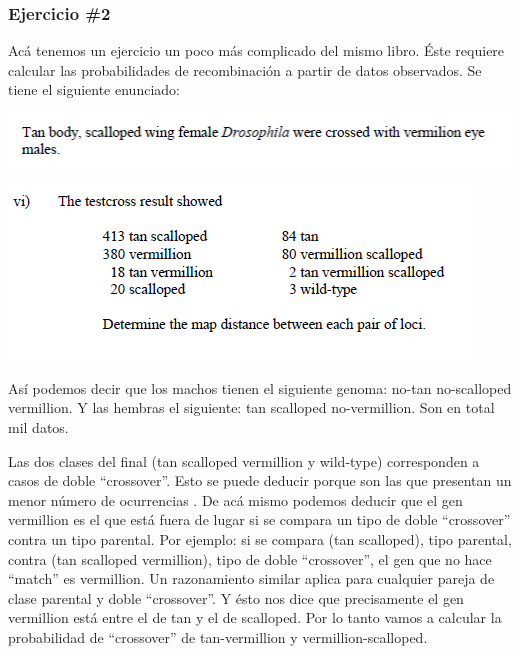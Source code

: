 \documentclass{article}
\begin{document}
	\subsubsection{Ejercicio \#2}
	
	Acá tenemos un ejercicio un poco más complicado del mismo libro. Éste requiere calcular las probabilidades de recombinación a partir de datos observados. Se tiene el siguiente enunciado:
	
	\begin{center}
		\includegraphics[scale=0.8]{images/e_4.png}
	\end{center}
	
	\begin{center}
		\includegraphics[scale=0.8]{images/e_5.png}
	\end{center}
	
	Así podemos decir que los machos tienen el siguiente genoma: no-tan no-scalloped vermillion. Y las hembras el siguiente: tan scalloped no-vermillion. Son en total mil datos.
	                                                     
	Las dos clases del final (tan scalloped vermillion y wild-type) corresponden a casos de doble ``crossover''. Esto se puede deducir porque son las que presentan un menor número de ocurrencias  \cite{carrinnes2003handbook}. De acá mismo podemos deducir que el gen vermillion es el que está fuera de lugar si se compara un tipo de doble ``crossover'' contra un tipo parental. Por ejemplo: si se compara (tan scalloped), tipo parental, contra (tan scalloped vermillion), tipo de doble ``crossover'', el gen que no hace ``match'' es vermillion. Un razonamiento similar aplica para cualquier pareja de clase parental y doble ``crossover''. Y ésto nos dice que precisamente el gen vermillion está entre el de tan y el de scalloped. Por lo tanto vamos a calcular la probabilidad de ``crossover'' de tan-vermillion y vermillion-scalloped.
	
\end{document}
